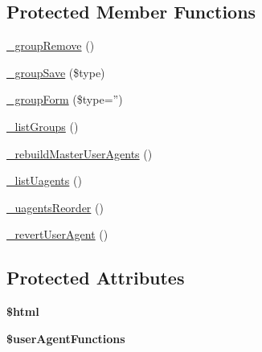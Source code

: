 \subsection*{Protected Member Functions}
\begin{DoxyCompactItemize}
\item 
\hyperlink{classadmin__core__tools__uagents_ad933d378030ce094cf821a5e80858766}{\-\_\-group\-Remove} ()
\item 
\hyperlink{classadmin__core__tools__uagents_af4bebfa8b66b99833f230741439e9a9c}{\-\_\-group\-Save} (\$type)
\item 
\hyperlink{classadmin__core__tools__uagents_a4b7a6e24342474a59f94e2aa44c94d7e}{\-\_\-group\-Form} (\$type='')
\item 
\hyperlink{classadmin__core__tools__uagents_ae042ccecb50b178000f76c5cb72ca8d5}{\-\_\-list\-Groups} ()
\item 
\hyperlink{classadmin__core__tools__uagents_a33cfa7931a0c217e13e3bce1c0ffdc26}{\-\_\-rebuild\-Master\-User\-Agents} ()
\item 
\hyperlink{classadmin__core__tools__uagents_a90b86a69046833160ef1cc284901b140}{\-\_\-list\-Uagents} ()
\item 
\hyperlink{classadmin__core__tools__uagents_adbffe552def81468ab43e9385365283e}{\-\_\-uagents\-Reorder} ()
\item 
\hyperlink{classadmin__core__tools__uagents_a3d271962179ff00618abf896750a60da}{\-\_\-revert\-User\-Agent} ()
\end{DoxyCompactItemize}
\subsection*{Protected Attributes}
\begin{DoxyCompactItemize}
\item 
\hypertarget{classadmin__core__tools__uagents_a6f96e7fc92441776c9d1cd3386663b40}{{\bfseries \$html}}\label{classadmin__core__tools__uagents_a6f96e7fc92441776c9d1cd3386663b40}

\item 
\hypertarget{classadmin__core__tools__uagents_a151defd58dc1c54abb965c466167b315}{{\bfseries \$user\-Agent\-Functions}}\label{classadmin__core__tools__uagents_a151defd58dc1c54abb965c466167b315}

\end{DoxyCompactItemize}


